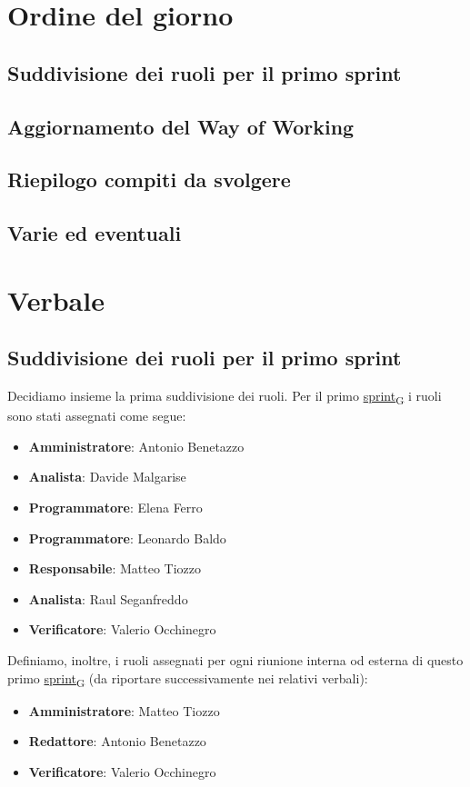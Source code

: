 \documentclass[italian,12pt]{article}
\begin{document}
\section{Ordine del giorno}
\subsection{Suddivisione dei ruoli per il primo sprint}
\subsection{Aggiornamento del Way of Working}
\subsection{Riepilogo compiti da svolgere}
\subsection{Varie ed eventuali}

\newpage

\section{Verbale}

\subsection{Suddivisione dei ruoli per il primo sprint}
Decidiamo insieme la prima suddivisione dei ruoli. Per il primo \href{https://7last.github.io/docs/rtb/documentazione-interna/glossario#sprint}{sprint\textsubscript{G}} i ruoli sono stati assegnati come segue:
\begin{itemize}
	\item \textbf{Amministratore}: Antonio Benetazzo
	\item \textbf{Analista}: Davide Malgarise
	\item \textbf{Programmatore}: Elena Ferro
	\item \textbf{Programmatore}: Leonardo Baldo
	\item \textbf{Responsabile}: Matteo Tiozzo
	\item \textbf{Analista}: Raul Seganfreddo
	\item \textbf{Verificatore}: Valerio Occhinegro
\end{itemize}
Definiamo, inoltre, i ruoli assegnati per ogni riunione interna od esterna 
di questo primo \href{https://7last.github.io/docs/rtb/documentazione-interna/glossario#sprint}{sprint\textsubscript{G}} (da riportare successivamente nei relativi verbali):
\begin{itemize}
	\item \textbf{Amministratore}: Matteo Tiozzo
	\item \textbf{Redattore}: Antonio Benetazzo
	\item \textbf{Verificatore}: Valerio Occhinegro
\end{itemize}
\end{document}
